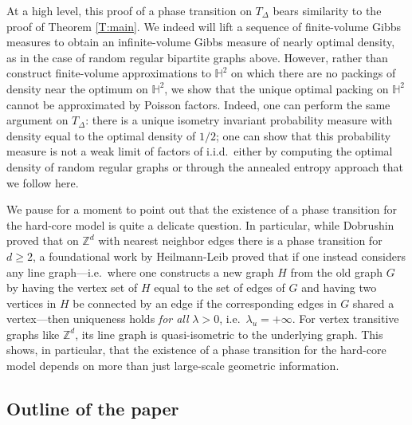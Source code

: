 \documentclass[11pt]{amsart}
\theoremstyle{definition}
\theoremstyle{remark}
\renewcommand{\H}{\mathbb{H}}
\newcommand{\Z}{\mathbb{Z}}
\begin{document}
At a high level, this proof of a phase transition on $T_\Delta$ bears similarity to the proof of Theorem \ref{T:main}.  We indeed will lift a sequence of finite-volume Gibbs measures to obtain an infinite-volume Gibbs measure of nearly optimal density, as in the case of random regular bipartite graphs above.  However, rather than construct finite-volume approximations to $\H^2$ on which there are no packings of density near the optimum on $\H^2$, we show that the unique optimal packing on $\H^2$ cannot be approximated by Poisson factors.  Indeed, one can perform the same argument on $T_\Delta$: there is a unique isometry invariant probability measure with density equal to the optimal density of $1/2$; one can show that this probability measure is not a weak limit of factors of i.i.d.\ either by computing the optimal density of random regular graphs or through the annealed entropy approach that we follow here.

We pause for a moment to point out that the existence of a phase transition for the hard-core model is quite a delicate question. In particular, while Dobrushin proved that on $\Z^d$ with nearest neighbor edges there is a phase transition for $d \geq 2$, a foundational work by Heilmann-Leib proved that if one instead considers any line graph---i.e.\ where one constructs a new graph $H$ from the old graph $G$ by having the vertex set of $H$ equal to the set of edges of $G$ and having two vertices in $H$ be connected by an edge if the corresponding edges in $G$ shared a vertex---then uniqueness holds \emph{for all} $\lambda > 0$, i.e.\ $\lambda_u = +\infty$.  For vertex transitive graphs like $\Z^d$, its line graph is quasi-isometric to the underlying graph.  This shows, in particular, that the existence of a phase transition for the hard-core model depends on more than just large-scale geometric information.  


\subsection{Outline of the paper}
\end{document}
